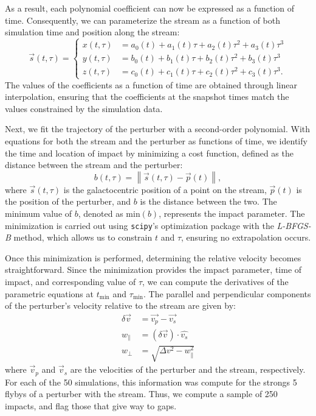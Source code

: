 \documentclass[draft]{aa}
\begin{document}
    As a result, each polynomial coefficient can now be expressed as a function of time. Consequently, we can parameterize the stream as a function of both simulation time and position along the stream:
    \begin{equation}
      \vec{s}(t,\tau) = 
      \left\{
      \begin{aligned}
        x(t,\tau) &= a_0(t) + a_1(t)\tau + a_2(t) \tau^2 + a_3(t)\tau^3 \\ 
        y(t,\tau) &= b_0(t) + b_1(t)\tau + b_2(t) \tau^2 + b_3(t)\tau^3 \\
        z(t,\tau) &= c_0(t) + c_1(t)\tau + c_2(t) \tau^2 + c_3(t)\tau^3.
        \end{aligned}
      \right.
    \end{equation}
    The values of the coefficients as a function of time are obtained through linear interpolation, ensuring that the coefficients at the snapshot times match the values constrained by the simulation data.

    Next, we fit the trajectory of the perturber with a second-order polynomial. With equations for both the stream and the perturber as functions of time, we identify the time and location of impact by minimizing a cost function, defined as the distance between the stream and the perturber:
    \begin{equation} 
      b(t, \tau) = \left\lVert \vec{s}(t, \tau) - \vec{p}(t) \right\rVert, 
      \end{equation}
    where $\vec{s}(t, \tau)$ is the galactocentric position of a point on the stream, $\vec{p}(t)$ is the position of the perturber, and $b$ is the distance between the two. The minimum value of $b$, denoted as $\text{min}(b)$, represents the impact parameter. The minimization is carried out using \texttt{scipy}'s optimization package with the \textit{L-BFGS-B} method, which allows us to constrain $t$ and $\tau$, ensuring no extrapolation occurs.

    Once this minimization is performed, determining the relative velocity becomes straightforward. Since the minimization provides the impact parameter, time of impact, and corresponding value of $\tau$, we can compute the derivatives of the parametric equations at $t_{\text{min}}$ and $\tau_{\text{min}}$. The parallel and perpendicular components of the perturber's velocity relative to the stream are given by:
    \begin{equation}
      \begin{aligned}
        \delta \vec{v} &=\vec{v_p} - \vec{v_s} \\
        w_\parallel &= \left(\delta \vec{v}\right)\cdot \hat{v_s}\\  
        w_\perp &=  \sqrt{\Delta v ^2 - w_\parallel ^ 2}
        \end{aligned}
      \end{equation}
    where $\vec{v}_p$ and $\vec{v}_s$ are the velocities of the perturber and the stream, respectively. For each of the 50 simulations, this information was compute for the strongs 5 flybys of a perturber with the stream. Thus, we compute a sample of 250 impacts, and flag those that give way to gaps. 
\end{document}

